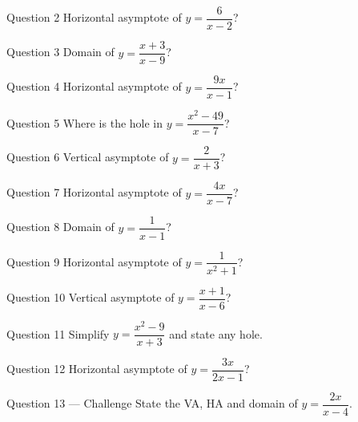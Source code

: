 \documentclass[11pt]{article}
\begin{document}
\begin{qbox}{Question 2}
Horizontal asymptote of $y=\dfrac{6}{x-2}$?\workspace{2.4cm}
\end{qbox}

\begin{qbox}{Question 3}
Domain of $y=\dfrac{x+3}{x-9}$?\workspace{2.4cm}
\end{qbox}

\begin{qbox}{Question 4}
Horizontal asymptote of $y=\dfrac{9x}{x-1}$?\workspace{2.4cm}
\end{qbox}

\begin{qbox}{Question 5}
Where is the hole in $y=\dfrac{x^2-49}{x-7}$?\workspace{2.4cm}
\end{qbox}

\begin{qbox}{Question 6}
Vertical asymptote of $y=\dfrac{2}{x+3}$?\workspace{2.4cm}
\end{qbox}

\begin{qbox}{Question 7}
Horizontal asymptote of $y=\dfrac{4x}{x-7}$?\workspace{2.4cm}
\end{qbox}

\begin{qbox}{Question 8}
Domain of $y=\dfrac{1}{x-1}$?\workspace{2.4cm}
\end{qbox}

\begin{qbox}{Question 9}
Horizontal asymptote of $y=\dfrac{1}{x^2+1}$?\workspace{2.4cm}
\end{qbox}

\begin{qbox}{Question 10}
Vertical asymptote of $y=\dfrac{x+1}{x-6}$?\workspace{2.4cm}
\end{qbox}

\begin{qbox}{Question 11}
Simplify $y=\dfrac{x^2-9}{x+3}$ and state any hole.\workspace{2.4cm}
\end{qbox}

\begin{qbox}{Question 12}
Horizontal asymptote of $y=\dfrac{3x}{2x-1}$?\workspace{2.4cm}
\end{qbox}

\begin{qbox}{Question 13 --- Challenge}
State the VA, HA and domain of $y=\dfrac{2x}{x-4}$.\workspace{3cm}
\end{qbox}
\end{document}
